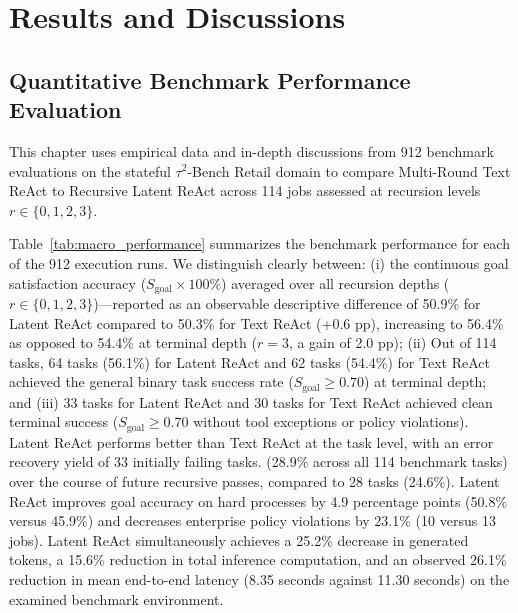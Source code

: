 \documentclass[a4paper, 12pt]{report}
\begin{document}
\chapter{Results and Discussions}
\fi

\label{chap.5}
\section{Quantitative Benchmark Performance Evaluation}
This chapter uses empirical data and in-depth discussions from 912 benchmark evaluations on the stateful $\tau^2$-Bench Retail domain to compare Multi-Round Text ReAct to Recursive Latent ReAct across 114 jobs assessed at recursion levels $r \in \{0, 1, 2, 3\}$.

Table~\ref{tab:macro_performance} summarizes the benchmark performance for each of the 912 execution runs. We distinguish clearly between: (i) the continuous goal satisfaction accuracy ($S_{\text{goal}} \times 100\%$) averaged over all recursion depths ($r \in \{0, 1, 2, 3\}$)---reported as an observable descriptive difference of 50.9\% for Latent ReAct compared to 50.3\% for Text ReAct (+0.6 pp), increasing to 56.4\% as opposed to 54.4\% at terminal depth ($r=3$, a gain of 2.0 pp); (ii) Out of 114 tasks, 64 tasks (56.1\%) for Latent ReAct and 62 tasks (54.4\%) for Text ReAct achieved the general binary task success rate ($S_{\text{goal}} \ge 0.70$) at terminal depth; and (iii) 33 tasks for Latent ReAct and 30 tasks for Text ReAct achieved clean terminal success ($S_{\text{goal}} \ge 0.70$ without tool exceptions or policy violations). Latent ReAct performs better than Text ReAct at the task level, with an error recovery yield of 33 initially failing tasks. (28.9\% across all 114 benchmark tasks) over the course of future recursive passes, compared to 28 tasks (24.6\%). Latent ReAct improves goal accuracy on hard processes by 4.9 percentage points (50.8\% versus 45.9\%) and decreases enterprise policy violations by 23.1\% (10 versus 13 jobs). Latent ReAct simultaneously achieves a 25.2\% decrease in generated tokens, a 15.6\% reduction in total inference computation, and an observed 26.1\% reduction in mean end-to-end latency (8.35 seconds against 11.30 seconds) on the examined benchmark environment.
\end{document}
